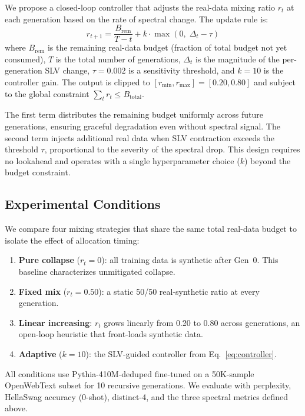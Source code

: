 We propose a closed-loop controller that adjusts the real-data mixing ratio $r_t$ at each generation based on the rate of spectral change.
The update rule is:
\begin{equation}
\label{eq:controller}
r_{t+1} = \frac{B_{\text{rem}}}{T - t} + k \cdot \max(0,\; \Delta_t - \tau)
\end{equation}
where $B_{\text{rem}}$ is the remaining real-data budget (fraction of total budget not yet consumed), $T$ is the total number of generations, $\Delta_t$ is the magnitude of the per-generation SLV change, $\tau{=}0.002$ is a sensitivity threshold, and $k{=}10$ is the controller gain.
The output is clipped to $[r_{\min}, r_{\max}] = [0.20, 0.80]$ and subject to the global constraint $\sum_t r_t \leq B_{\text{total}}$.

The first term distributes the remaining budget uniformly across future generations, ensuring graceful degradation even without spectral signal.
The second term injects additional real data when SLV contraction exceeds the threshold $\tau$, proportional to the severity of the spectral drop.
This design requires no lookahead and operates with a single hyperparameter choice ($k$) beyond the budget constraint.

\subsection{Experimental Conditions}
\label{subsec:conditions}

We compare four mixing strategies that share the same total real-data budget to isolate the effect of allocation timing:

\begin{enumerate}
\item \textbf{Pure collapse} ($r_t{=}0$): all training data is synthetic after Gen~0. This baseline characterizes unmitigated collapse.
\item \textbf{Fixed mix} ($r_t{=}0.50$): a static 50/50 real-synthetic ratio at every generation.
\item \textbf{Linear increasing}: $r_t$ grows linearly from 0.20 to 0.80 across generations, an open-loop heuristic that front-loads synthetic data.
\item \textbf{Adaptive} ($k{=}10$): the SLV-guided controller from Eq.~\ref{eq:controller}.
\end{enumerate}

All conditions use Pythia-410M-deduped fine-tuned on a 50K-sample OpenWebText subset for 10 recursive generations.
We evaluate with perplexity, HellaSwag accuracy (0-shot), distinct-4, and the three spectral metrics defined above.